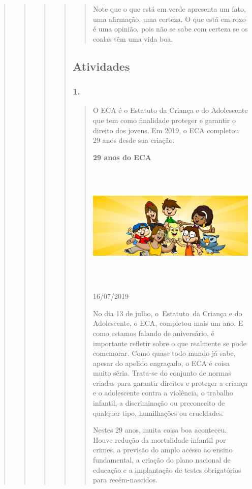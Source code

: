 \begin{quote}
\begin{quote}
\begin{quote}
\begin{quote}
\begin{quote}
Note que o que está em verde apresenta um fato, uma afirmação, uma
certeza. O que está em roxo é uma opinião, pois não se sabe com certeza
se os coalas têm uma vida boa.
\end{quote}

\subsection{Atividades}\label{atividades-7}

\subsubsection{1. }\label{section-60}

\begin{quote}
O ECA é o Estatuto da Criança e do Adolescente que tem como finalidade
proteger e garantir o direito dos jovens. Em 2019, o ECA completou 29
anos desde sua criação.

\textbf{29 anos do ECA}

\includegraphics[width=5.90556in,height=2.30417in]{media/image26.jpeg}

16/07/2019~

No dia 13 de julho, o~Estatuto~da Criança e do Adolescente, o ECA,
completou mais um ano. E como estamos falando de aniversário, é
importante refletir sobre o que realmente se pode comemorar. Como quase
todo mundo já sabe, apesar do apelido engraçado, o ECA é coisa muito
séria. Trata-se do conjunto de normas criadas para garantir direitos e
proteger a criança e o adolescente contra a violência, o trabalho
infantil, a discriminação ou preconceito de qualquer tipo, humilhações
ou crueldades.

Nestes 29 anos, muita coisa boa aconteceu. Houve redução da mortalidade
infantil por crimes, a previsão do amplo acesso ao ensino fundamental, a
criação do plano nacional de educação e a implantação de testes
obrigatórios para recém-nascidos.


\end{quote}
\end{quote}
\end{quote}
\end{quote}
\end{quote}
